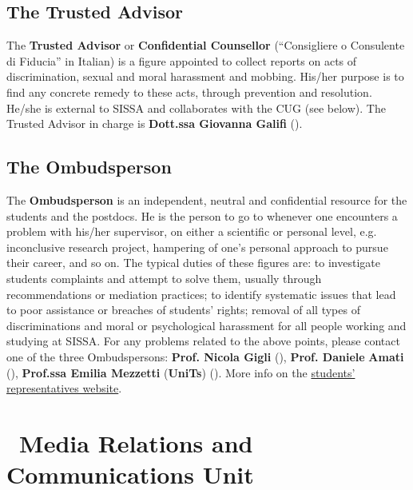 \documentclass{sissavademecum}
\begin{document}
\section{The Trusted Advisor}

 The \textbf{Trusted Advisor} or \textbf{Confidential Counsellor }(``Consigliere o Consulente di Fiducia'' in Italian) is a figure appointed to collect reports on acts of discrimination, sexual and moral harassment and mobbing. His/her purpose is to find any concrete remedy to these acts, through prevention and resolution. He/she is external to SISSA and collaborates with the CUG (see below). The Trusted Advisor in charge is \textbf{Dott.ssa Giovanna Galifi} ().
 
 \section{The Ombudsperson}

The \textbf{Ombudsperson} is an independent, neutral and confidential resource for the students and the postdocs. He is the person to go to whenever one encounters a problem with his/her supervisor, on either a scientific or personal level, e.g. inconclusive research project, hampering of one's personal approach to pursue their career, and so on. The typical duties of these figures are: to investigate students complaints and attempt to solve them, usually through recommendations or mediation practices; to identify systematic issues that lead to poor assistance or breaches of students' rights; removal of all types of discriminations and moral or psychological harassment for all people working and studying at SISSA. For any problems related to the above points, please contact one of the three Ombudspersons: \textbf{Prof. Nicola Gigli} (), \textbf{Prof. Daniele }\textbf{Amati} (), \textbf{Prof.ssa Emilia Mezzetti} (\textbf{UniTs}) \textbf{}(). More info on the \href{http://students.sissa.it/issues/ombudsperson.html}{students' representatives website}.








\chapter{\texorpdfstring{\faNewspaper\ }{}Media Relations and Communications Unit}
\end{document}
